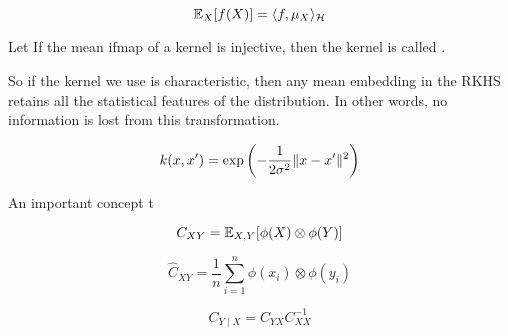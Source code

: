 \begin{equation}
\mathbb{E}_X[f(X)] = \langle f, \mu_X\rangle_\mathcal{H}
\end{equation}

\begin{definition}
  Let If the mean ifmap of a kernel is injective, then the kernel is called .
\end{definition}

So if the kernel we use is characteristic, then any mean embedding in the RKHS retains all the statistical features of the distribution. In other words, no information is lost from this transformation.

\begin{equation}
  k(x,x') = \exp\left(-\frac{1}{2\sigma^2} \lVert x-x'\rVert^2 \right)
\end{equation}

An important concept t

\begin{equation}
  C_{XY} = \mathbb{E}_{X, Y}[\phi(X) \otimes \phi(Y)]
\end{equation}

\begin{equation}
  \widehat{C}_{XY} = \frac{1}{n} \sum_{i=1}^n \phi(x_i) \otimes \phi(y_i)
\end{equation}

\begin{equation}
  C_{Y \mid X} = C_{YX} C_{XX}^{-1}
\end{equation}
